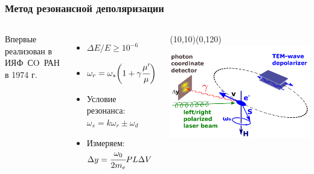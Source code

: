\documentclass[14pt]{beamer}
\begin{document}
\begin{frame}
\frametitle{Метод резонансной деполяризации}
	\vspace{30pt}
	\begin{columns}
		\begin{minipage}[t][1\textheight]{\linewidth}
				\small{\flushleft	Впервые реализован в ИЯФ~СO~РАН в 1974 г. 
				\begin{itemize}
					\item $\Delta E/E \geqslant 10^{-6}$
					\item $\omega_r = \omega_s \biggl(1+ \gamma \cfrac{\mu'}{\mu}\biggr)$
					\item Условие резонанса: $\omega_s  = k \omega_r \pm \omega_d$
					\item Измеряем: $\Delta y = \cfrac{\omega_0}{2m_e}PL\Delta V$
				\end{itemize}}
		\end{minipage}%
		\begin{minipage}[t][1\textheight]{\linewidth}
			\begin{picture}(10,10)(0,120)
				\includegraphics[width=1\linewidth]{mrd-lsrp.png}
			\end{picture}
		\end{minipage}%
	\end{columns}
	\begin{center}
		
	\end{center}
\end{frame}
\end{document}
